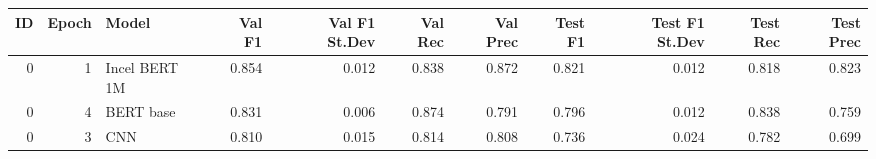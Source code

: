 \begin{tabular}{rrlrrrrrrrr}
\toprule
 ID &  Epoch &         Model &  Val F1 &  Val F1 St.Dev &  Val Rec &  Val Prec &  Test F1 &  Test F1 St.Dev &  Test Rec &  Test Prec \\
\midrule
  0 &      1 & Incel BERT 1M &   0.854 &          0.012 &    0.838 &     0.872 &    0.821 &           0.012 &     0.818 &      0.823 \\
  0 &      4 &     BERT base &   0.831 &          0.006 &    0.874 &     0.791 &    0.796 &           0.012 &     0.838 &      0.759 \\
  0 &      3 &           CNN &   0.810 &          0.015 &    0.814 &     0.808 &    0.736 &           0.024 &     0.782 &      0.699 \\
\bottomrule
\end{tabular}
